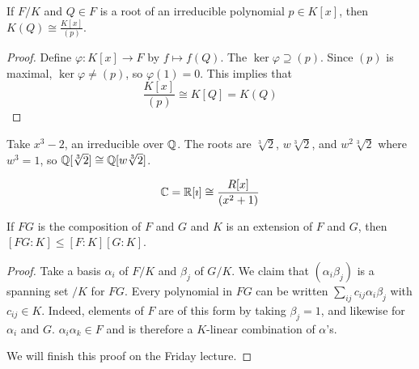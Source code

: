 \documentclass[a4paper,twoside,master.tex]{subfiles}
\begin{document}
\begin{claim}
    If $ F/K $ and $ Q \in F $ is a root of an irreducible polynomial $ p \in K[x] $, then $ K(Q) \cong \frac{K[x]}{(p)} $.
\end{claim}
\begin{proof}
    Define $ \varphi \colon K[x] \to F $ by $ f \mapsto f(Q) $. The $ \ker \varphi \supseteq (p) $. Since $ (p) $ is maximal, $ \ker \varphi \neq (p) $, so $ \varphi(1) = 0 $. This implies that
    \begin{equation}
        \frac{K[x]}{(p)} \cong K[Q] = K(Q)
    \end{equation}
\end{proof}

\begin{ex}
    Take $ x^3 - 2 $, an irreducible over $ \mathbb{Q} $. The roots are $ \sqrt[3]{2} $, $ w \sqrt[3]{2} $, and $ w^2 \sqrt[3]{2} $ where $ w^3 = 1 $, so $ \mathbb{Q}[\sqrt[3]{2}] \cong \mathbb{Q}[w\sqrt[3]{2}] $.
\end{ex}

\begin{ex}
    \begin{equation}
        \mathbb{C} = \mathbb{R}[\imath] \cong \frac{R[x]}{(x^2 + 1)}
    \end{equation}
\end{ex}

\begin{claim}
    If $ FG $ is the composition of $ F $ and $ G $ and $ K $ is an extension of $ F $ and $ G $, then $ [FG:K] \leq [F:K][G:K] $.
\end{claim}
\begin{proof}
    Take a basis $ \alpha_i $ of $ F/K $ and $ \beta_j $ of $ G/K $. We claim that $ (\alpha_i \beta_j) $ is a spanning set $ /K $ for $ FG $. Every polynomial in $ FG $ can be written $ \sum_{ij} c_{ij} \alpha_i \beta_j $ with $ c_{ij} \in K $. Indeed, elements of $ F $ are of this form by taking $ \beta_j = 1 $, and likewise for $ \alpha_i $ and $ G $. $ \alpha_i \alpha_k \in F $ and is therefore a $ K $-linear combination of $\alpha$'s.

    We will finish this proof on the Friday lecture.
\end{proof}
\end{document}

